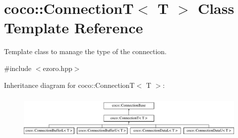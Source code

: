 \hypertarget{classcoco_1_1_connection_t}{\section{coco\-:\-:Connection\-T$<$ T $>$ Class Template Reference}
\label{classcoco_1_1_connection_t}
}


Template class to manage the type of the connection.  




{\ttfamily \#include $<$ezoro.\-hpp$>$}

Inheritance diagram for coco\-:\-:Connection\-T$<$ T $>$\-:\begin{figure}[H]
\begin{center}
\leavevmode
\includegraphics[height=2.187500cm]{classcoco_1_1_connection_t}
\end{center}
\end{figure}
